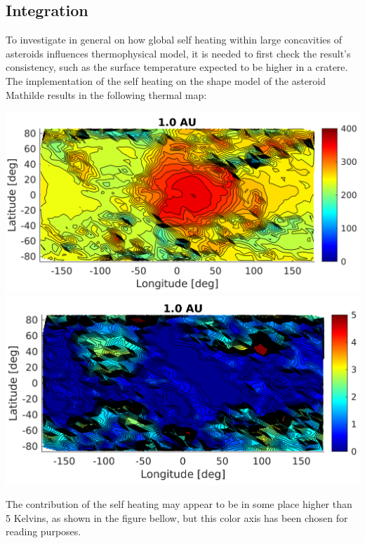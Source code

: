 \subsection{Integration}
To investigate in general on how global self heating within large concavities of asteroids influences thermophysical model, it is needed to first check the result's consistency, such as the surface temperature expected to be higher in a cratere. The implementation of the self heating on the shape model of the asteroid Mathilde results in the following thermal map:
\begin{center}
    \includegraphics[width=\linewidth]{rsc/self_2D.png}
    \includegraphics[width=\linewidth]{rsc/self_2D_diff.png}
    \label{fig:5.3}
\end{center}
The contribution of the self heating may appear to be in some place higher than 5 Kelvins, as shown in the figure bellow, but this color axis has been chosen for reading purposes.
